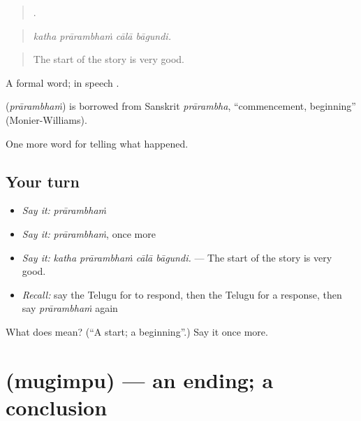\begin{quote}
   .
\end{quote}

\begin{quote}
\emph{katha prārambhaṁ cālā bāgundi.}
\end{quote}

\begin{quote}
The start of the story is very good.
\end{quote}

A formal word; in speech .

\begin{cousinweb}
\textbf{} (\emph{prārambhaṁ}) is borrowed from Sanskrit \emph{prārambha}, \textquotedblleft{}commencement, beginning\textquotedblright{} (Monier-Williams).
\end{cousinweb}

\begin{grammarlens}[title={What you've built}]
One more word for telling what happened.
\end{grammarlens}

\subsection*{Your turn}
\begin{itemize}
\raggedright
  \item \emph{Say it:} \emph{prārambhaṁ}
  \item \emph{Say it:} \emph{prārambhaṁ}, once more
  \item \emph{Say it:} \emph{katha prārambhaṁ cālā bāgundi.} — The start of the story is very good.
  \item \emph{Recall:} say the Telugu for to respond, then the Telugu for a response, then say \emph{prārambhaṁ} again
\end{itemize}

\begin{tcolorbox}[breakable,colback=teal!4,colframe=teal!35!black,title={Before you move on}]
What does  mean? (\textquotedblleft{}A start; a beginning\textquotedblright{}.) Say it once more.
\end{tcolorbox}
\section[\texorpdfstring{\te{ముగింపు} (mugimpu)}{ముగింపు (mugimpu)}]{ (mugimpu) — an ending; a conclusion}

